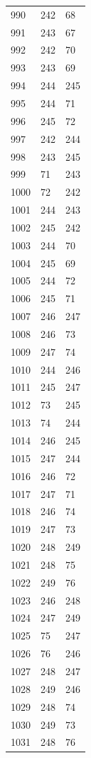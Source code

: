 \documentclass[a4paper,11pt]{article}
\begin{document}
\begin{center}
\begin{longtable}{|R{1.5cm}|R{1.5cm}|R{1.5cm}|}
  990 &  242 &   68 \\
  991 &  243 &   67 \\
  992 &  242 &   70 \\
  993 &  243 &   69 \\
  994 &  244 &  245 \\
  995 &  244 &   71 \\
  996 &  245 &   72 \\
  997 &  242 &  244 \\
  998 &  243 &  245 \\
  999 &   71 &  243 \\
 1000 &   72 &  242 \\
 1001 &  244 &  243 \\
 1002 &  245 &  242 \\
 1003 &  244 &   70 \\
 1004 &  245 &   69 \\
 1005 &  244 &   72 \\
 1006 &  245 &   71 \\
 1007 &  246 &  247 \\
 1008 &  246 &   73 \\
 1009 &  247 &   74 \\
 1010 &  244 &  246 \\
 1011 &  245 &  247 \\
 1012 &   73 &  245 \\
 1013 &   74 &  244 \\
 1014 &  246 &  245 \\
 1015 &  247 &  244 \\
 1016 &  246 &   72 \\
 1017 &  247 &   71 \\
 1018 &  246 &   74 \\
 1019 &  247 &   73 \\
 1020 &  248 &  249 \\
 1021 &  248 &   75 \\
 1022 &  249 &   76 \\
 1023 &  246 &  248 \\
 1024 &  247 &  249 \\
 1025 &   75 &  247 \\
 1026 &   76 &  246 \\
 1027 &  248 &  247 \\
 1028 &  249 &  246 \\
 1029 &  248 &   74 \\
 1030 &  249 &   73 \\
 1031 &  248 &   76 \\

\end{longtable}
\end{center}
\end{document}
